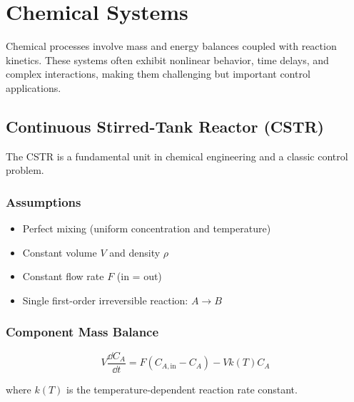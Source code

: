 
\chapter{Chemical Systems}
\label{ch:chemical}

Chemical processes involve mass and energy balances coupled with reaction kinetics. These systems often exhibit nonlinear behavior, time delays, and complex interactions, making them challenging but important control applications.

\section{Continuous Stirred-Tank Reactor (CSTR)}
\label{sec:cstr}

The CSTR is a fundamental unit in chemical engineering and a classic control problem.



\subsection{Assumptions}

\begin{itemize}
    \item Perfect mixing (uniform concentration and temperature)
    \item Constant volume $V$ and density $\rho$
    \item Constant flow rate $F$ (in = out)
    \item Single first-order irreversible reaction: $A \to B$
\end{itemize}

\subsection{Component Mass Balance}

\begin{equation}
V\frac{\dd C_A}{\dd t} = F(C_{A,\text{in}} - C_A) - Vk(T)C_A
\end{equation}

where $k(T)$ is the temperature-dependent reaction rate constant.

